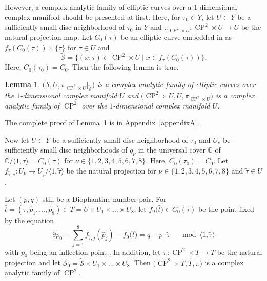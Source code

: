 \documentclass[pdftex]{sigma}
\numberwithin{equation}{section}
\newtheorem{Lemma}[Theorem]{Lemma}
\begin{document}
However, a complex analytic family of elliptic curves over a 1-dimensional complex manifold should be presented at first. Here, for $\tau_0\in Y$, let $U \subset Y$ be a sufficiently small disc neighborhood of $\tau_0$ in $Y$ and $\pi_{\operatorname{CP}^2 \times U}\colon \operatorname{CP}^2\times U\rightarrow U$ be the natural projection map. Let $C_0(\tau)$ be an elliptic curve embedded in
 as $f_{\tau}(C_0(\tau))\times \{ \tau \}$
for $\tau \in U$ and
\[\widetilde{\mathcal{S}}=\bigl\{ (x, \tau) \in \operatorname{CP}^2 \times U\mid x \in f_{\tau}(C_0(\tau)) \bigr\}.
\]
 Here, $C_0( \tau_0)=C_0$. Then the following lemma is true.

\begin{Lemma}\label{Lemma3.2}
\emph{$\bigl(\widetilde{\mathcal{S}},U,\pi_{\operatorname{CP}^2 \times U}|_{\widetilde{\mathcal{S}}}\bigr)$} is a complex analytic family of elliptic curves over the $1$-di\-men\-sion\-al complex manifold $U$ and \emph{$\bigl(\operatorname{CP}^2\times U, U,\pi_{\operatorname{CP}^2\times U}\bigr)$} is a complex analytic family of \emph{ $\operatorname{CP}^2$} over the $1$-dimensional complex manifold $U$.
\end{Lemma}

The complete proof of Lemma~\ref{Lemma3.2} is in Appendix~\ref{appendixA}.

Now let $U \subset Y$ be a sufficiently small disc neighborhood of $\tau_0$ and $U_\nu$ be sufficiently small disc neighborhoods of $q_\nu$ in the universal cover $\mathbb{C}$ of $ \mathbb{C}/ \langle 1,\tau \rangle=C_0({\tau})$ for $\nu \in \{1,2,3,4,5,6,7,8 \}$. Here, $C_0(\tau_0)=C_0$. Let $f_{\widetilde{\tau},\nu}\colon U_{\nu}\!\rightarrow U_{_\nu}/\langle 1, \widetilde{\tau}\rangle$ be the natural projection for $\nu \in \{1,2,3,4,5,6,7,8 \}$ and $\widetilde{\tau}\in U$.

Let $(p,q)$ still be a Diophantine number pair. For $\hat{t}=(\widetilde{\tau},\hat{p}_1,\dots ,\hat{p}_8)\in T =U \times U_1 \times \dots \times U_8$, let $f_9\bigl(\hat{t}\bigr) \in C_0(\widetilde{\tau})$ be the point fixed by the equation
\[9p_0-\sum _{j=1}^8f_{\widetilde{\tau},j}(\hat{p}_j)-f_9\bigl(\hat{t}\bigr)=q-p\cdot \widetilde{\tau} \quad \mod \langle 1, \widetilde{\tau} \rangle \]
with $p_0$ being an inflection point \cite{Takayuki-Takato2}. In addition, let $\pi\colon\operatorname{CP}^2 \times T \rightarrow T$ be the natural projection and let $\mathcal{S}_0=\widetilde{\mathcal{S}} \times U_1 \times \dots \times U_8$. Then $\bigl(\operatorname{CP}^2 \times T,T, \pi\bigr)$ is a complex analytic family of $\operatorname{CP}^2$.
\end{document}
